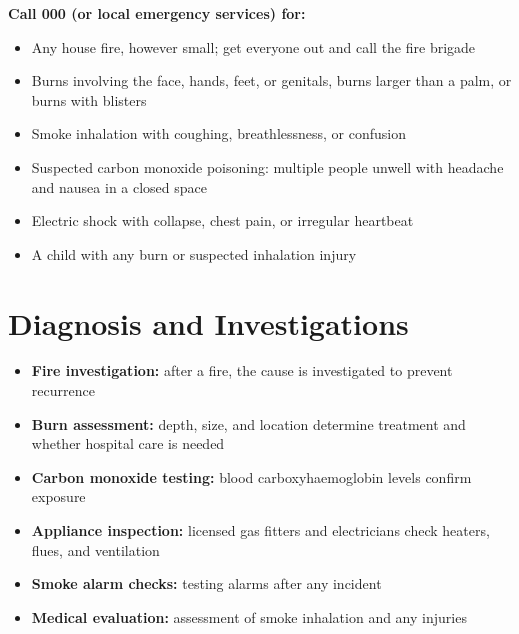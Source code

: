 \textbf{Call 000 (or local emergency services) for:}
\begin{itemize}
    \item Any house fire, however small; get everyone out and call the fire brigade
    \item Burns involving the face, hands, feet, or genitals, burns larger than a palm, or burns with blisters
    \item Smoke inhalation with coughing, breathlessness, or confusion
    \item Suspected carbon monoxide poisoning: multiple people unwell with headache and nausea in a closed space
    \item Electric shock with collapse, chest pain, or irregular heartbeat
    \item A child with any burn or suspected inhalation injury
\end{itemize}

\section*{Diagnosis and Investigations}
\begin{itemize}
    \item \textbf{Fire investigation:} after a fire, the cause is investigated to prevent recurrence
    \item \textbf{Burn assessment:} depth, size, and location determine treatment and whether hospital care is needed
    \item \textbf{Carbon monoxide testing:} blood carboxyhaemoglobin levels confirm exposure
    \item \textbf{Appliance inspection:} licensed gas fitters and electricians check heaters, flues, and ventilation
    \item \textbf{Smoke alarm checks:} testing alarms after any incident
    \item \textbf{Medical evaluation:} assessment of smoke inhalation and any injuries
\end{itemize}

